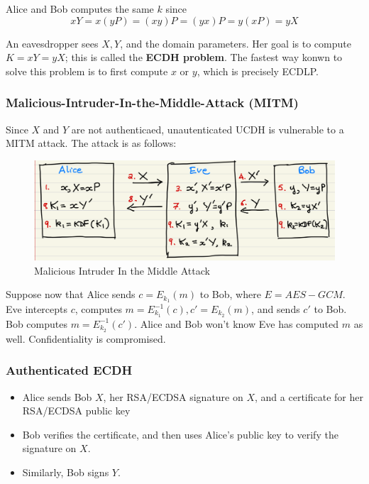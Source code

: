 \documentclass[12pt,titlepage]{article}
\begin{document}
Alice and Bob computes the same $k$ since $$xY = x(yP) = (xy)P = (yx)P = y(xP) = yX$$

An eavesdropper sees $X, Y$, and the domain parameters. Her goal is to compute $K = xY = yX$; this is called the \textbf{ECDH problem}. The fastest way konwn to solve this problem is to first compute $x$ or $y$, which is precisely ECDLP. 

\subsubsection{Malicious-Intruder-In-the-Middle-Attack (MITM)}
Since $X$ and $Y$ are not authenticaed, unautenticated UCDH is vulnerable to a MITM attack. The attack is as follows: 
\begin{center}
	\begin{figure}[h!]
		\centering
		\includegraphics[width=\textwidth]{Malicious_Intruder_In_the_Middle_Attack.png}
		\caption{Malicious Intruder In the Middle Attack}
	\end{figure}
\end{center}

Suppose now that Alice sends $c = E_{k_1}(m)$ to Bob, where $E = AES-GCM$. Eve intercepts $c$, computes $m = E_{k_1}^{-1}(c), c' = E_{k_2}(m)$, and sends $c'$ to Bob. Bob computes $m = E_{k_2}^{-1}(c')$. Alice and Bob won't know Eve has computed $m$ as well. Confidentiality is compromised. 

\subsubsection{Authenticated ECDH}
\begin{itemize}
	\item Alice sends Bob $X$, her RSA/ECDSA signature on $X$, and a certificate for her RSA/ECDSA public key
	\item Bob verifies the certificate, and then uses Alice's public key to verify the signature on $X$. 
	\item Similarly, Bob signs $Y$. 
\end{itemize}
\end{document}
